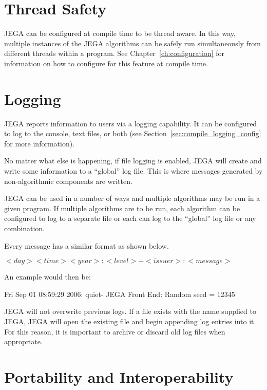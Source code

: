 \section{Thread Safety} \label{sec:thread_safety}

JEGA can be configured at compile time to be thread aware.  In this
way, multiple instances of the JEGA algorithms can be safely run
simultaneously from different threads within a program.  See
Chapter~\ref{ch:configuration} for information on how to configure
for this feature at compile time.

\section{Logging} \label{sec:logging}
JEGA reports information to users via a logging capability.  It can
be configured to log to the console, text files, or both (see
Section~\ref{sec:compile_logging_config} for more information).

No matter what else is happening, if file logging is enabled, JEGA
will create and write some information to a ``global'' log file.
This is where messages generated by non-algorithmic components are
written.

JEGA can be used in a number of ways and multiple algorithms may be
run in a given program.  If multiple algorithms are to be run, each
algorithm can be configured to log to a separate file or each can
log to the ``global'' log file or any combination.

Every message has a similar format as shown below.

\begin{center}
$<day> <time> <year>: <level>- <issuer>: <message>$
\end{center}

An example would then be:

\begin{center}
Fri Sep 01 08:59:29 2006: quiet- JEGA Front End: Random seed = 12345
\end{center}

JEGA will not overwrite previous logs.  If a file exists with the
name supplied to JEGA, JEGA will open the existing file and begin
appending log entries into it.  For this reason, it is important to
archive or discard old log files when appropriate.

\section{Portability and Interoperability} \label{sec:interop}

